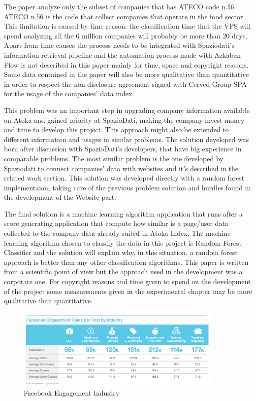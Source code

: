 The paper analyze only the subset of companies that has ATECO code n.56. ATECO n.56 is the code that collect companies that operate in the food sector\cite{istat}. This limitation is caused by time reason: the classification time that the VPS will spend analyzing all the 6 million companies will probably be more than 20 days. Apart from time causes the process needs to be integrated with Spaziodati's information retrieval pipeline and the automation process made with Azkaban Flow is not described in this paper mainly for time, space and copyright reasons. Some data contained in the paper will also be more qualitative than quantitative in order to respect the non disclosure agreement signed with Cerved Group SPA for the usage of the companies' data index.

This problem was an important step in upgrading company information available on Atoka and gained priority at SpazioDati, making the company invest money and time to develop this project. This approach might also be extended to different information and usages in similar problems.
The solution developed was born after discussion with SpazioDati's developers, that have big experience in comparable problems. The most similar problem is the one developed by Spaziodati to connect companies' data with websites and it's described in the related work section. This solution was developed directly with a random forest implementaion, taking care of the previous problem solution and hurdles found in the development of the Website part.

The final solution is a machine learning algorithm application that runs after a score generating application that compute how similar is a page/user data collected to the company data already suited in Atoka Index. The machine learning algorithm chosen to classify the data in this project is Random Forest Classifier and the solution will explain why, in this situation, a random forest approach is better than any other classification algorithms. This paper is written from a scientific point of view but the approach used in the development was a corporate one. For copyright reasons and time given to spend on the development of the project some measurements given in the experimental chapter may be more qualitative than quantitative.

\begin{figure}
\centering
\includegraphics[width=0.9\textwidth]{img/fb_eng.png}
\caption{Facebook Engagement Industry}
\label{Fig.1}
\end{figure}


